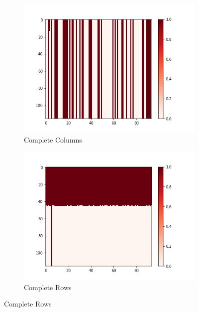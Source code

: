 \documentclass[10pt, conference, compsocconf]{IEEEtran}
\begin{document}
\begin{figure}[h!]
        \centering
        \begin{subfigure}[b]{0.45\columnwidth}
                  \includegraphics[width=\columnwidth]{figures/5vs7_columns_04_training}
                  \caption{Complete Columns}
                  \label{fig:Columns-Sample-Training-set}
        \end{subfigure}
        \begin{subfigure}[b]{0.45\columnwidth}
                  \includegraphics[width=\columnwidth]{figures/5vs7_rows_04_training}
                  \caption{Complete Rows}
                  \label{fig:Rows-Sample-Training-set}
        \end{subfigure}

\end{figure}
\end{document}
